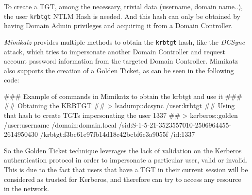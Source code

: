 \begin{itemize}
To create a TGT, among the necessary, trivial data (username, domain name..), the user \texttt{krbtgt} NTLM Hash is needed. And this hash can only be obtained by having Domain Admin privileges and acquiring it from a Domain Controller.

%
%
%

\pagebreak
\textit{Mimikatz}\cite{Mimikatz} provides multiple methods to obtain the \texttt{krbtgt} hash, like the \textit{DCSync} attack, which tries to impersonate another Domain Controller and request account password information from the targeted Domain Controller. Mimikatz also supports the creation of a Golden Ticket, as can be seen in the following code\cite{GoldenTicket2}:

\vspace{7pt}
\begin{spverbatim}
### Example of commands in Mimikatz to obtain the krbtgt and use it ###
## Obtaining the KRBTGT ##
> lsadump::dcsync /user:krbtgt
## Using that hash to create TGTs impersonating the user 1337 ##
> kerberos::golden /user:username /domain:domain.local /sid:S-1-5-21-3523557010-2506964455-2614950430 /krbtgt:f3bc61e97fb14d18c42bcbf6c3a9055f /id:1337 
\end{spverbatim}
\vspace{7pt}

So the Golden Ticket technique leverages the lack of validation on the Kerberos authentication protocol in order to impersonate a particular user, valid or invalid. This is due to the fact that users that have a TGT in their current session will be considered as trusted for Kerberos, and therefore can try to access any resource in the network.


\end{itemize}
